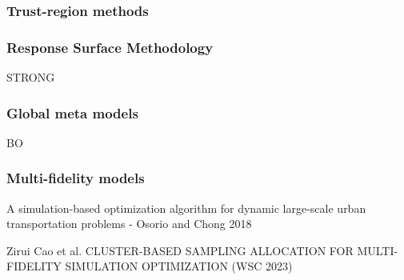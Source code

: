 \message{ !name(SO-Methods.tex)}\documentclass{article}
\begin{document}
\subsubsection{Trust-region methods}

\subsubsection{Response Surface Methodology}

STRONG

\subsubsection{Global meta models}

BO

\subsubsection{Multi-fidelity models}

A simulation-based optimization algorithm for dynamic large-scale urban transportation problems - Osorio and Chong 2018 \newline

Zirui Cao et al. CLUSTER-BASED SAMPLING ALLOCATION FOR MULTI-FIDELITY SIMULATION OPTIMIZATION (WSC 2023)
\end{document}
